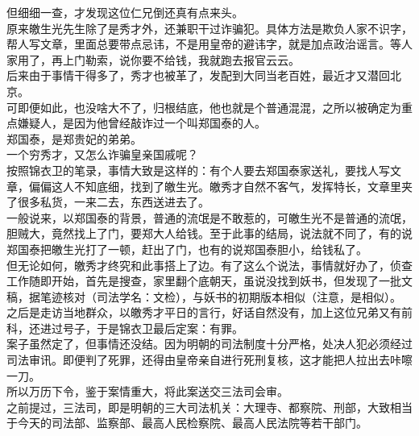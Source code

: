 \begin{multicols}{\theparacolNo}
但细细一查，才发现这位仁兄倒还真有点来头。\\

原来皦生光先生除了是秀才外，还兼职干过诈骗犯。具体方法是欺负人家不识字，帮人写文章，里面总要带点忌讳，不是用皇帝的避讳字，就是加点政治谣言。等人家用了，再上门勒索，说你要不给钱，我就跑去报官云云。\\

后来由于事情干得多了，秀才也被革了，发配到大同当老百姓，最近才又潜回北京。\\

可即便如此，也没啥大不了，归根结底，他也就是个普通混混，之所以被确定为重点嫌疑人，是因为他曾经敲诈过一个叫郑国泰的人。\\

郑国泰，是郑贵妃的弟弟。\\

一个穷秀才，又怎么诈骗皇亲国戚呢？\\

按照锦衣卫的笔录，事情大致是这样的：有个人要去郑国泰家送礼，要找人写文章，偏偏这人不知底细，找到了皦生光。皦秀才自然不客气，发挥特长，文章里夹了很多私货，一来二去，东西送进去了。\\

一般说来，以郑国泰的背景，普通的流氓是不敢惹的，可皦生光不是普通的流氓，胆贼大，竟然找上了门，要郑大人给钱。至于此事的结局，说法就不同了，有的说郑国泰把皦生光打了一顿，赶出了门，也有的说郑国泰胆小，给钱私了。\\

但无论如何，皦秀才终究和此事搭上了边。有了这么个说法，事情就好办了，侦查工作随即开始，首先是搜查，家里翻个底朝天，虽说没找到妖书，但发现了一批文稿，据笔迹核对（司法学名：文检），与妖书的初期版本相似（注意，是相似）。\\

之后是走访当地群众，以皦秀才平日的言行，好话自然没有，加上这位兄弟又有前科，还进过号子，于是锦衣卫最后定案：有罪。\\

案子虽然定了，但事情还没结。因为明朝的司法制度十分严格，处决人犯必须经过司法审讯。即便判了死罪，还得由皇帝亲自进行死刑复核，这才能把人拉出去咔嚓一刀。\\

所以万历下令，鉴于案情重大，将此案送交三法司会审。\\

之前提过，三法司，即是明朝的三大司法机关：大理寺、都察院、刑部，大致相当于今天的司法部、监察部、最高人民检察院、最高人民法院等若干部门。\\


\end{multicols}
